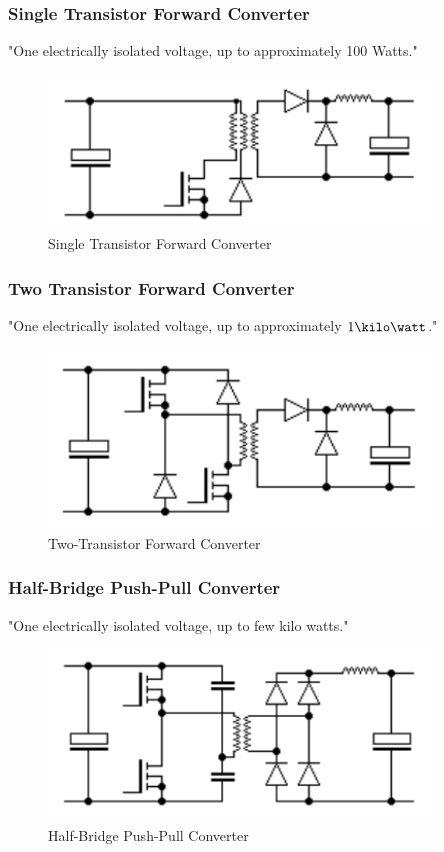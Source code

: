 \subsubsection{Single Transistor Forward Converter} 
"One electrically isolated voltage, up to approximately 100 Watts."\cite{SMPSD}
\begin{figure}[H]
\begin{center}
\includegraphics[width=4in]{includes/SingleTransistorFC}
\caption{Single Transistor Forward Converter}
\label{fig:1}
\end{center}
\end{figure}


\subsubsection{Two Transistor Forward Converter}
 "One electrically isolated voltage, up to approximately $1\kilo\watt$."\cite{SMPSD}
\begin{figure}[H]
\begin{center}
\includegraphics[width=4in]{includes/TwoTransistorFC}
\caption{Two-Transistor Forward Converter}
\label{fig:1}
\end{center}
\end{figure}

\subsubsection{Half-Bridge Push-Pull Converter}
 "One electrically isolated voltage, up to few kilo watts."\cite{SMPSD}
\begin{figure}[H]
\begin{center}
\includegraphics[width=4in]{includes/HalfBridgePushPullC}
\caption{Half-Bridge Push-Pull Converter}
\label{fig:1}
\end{center}
\end{figure}

